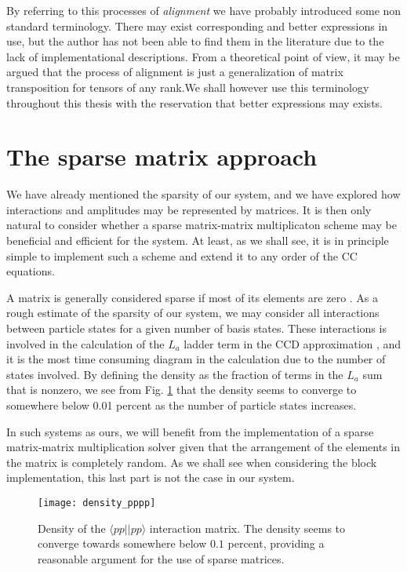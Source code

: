 By referring to this processes of \emph{alignment} we have probably introduced some non standard terminology. There may exist corresponding and better expressions in use, but the author has not been able to find them in the literature due to the lack of implementational descriptions. From a theoretical point of view, it may be argued that the process of alignment is just a generalization of matrix transposition for tensors of any rank.We shall however use this terminology throughout this thesis with the reservation that better expressions may exists.



\section{The sparse matrix approach}

We have already mentioned the sparsity of our system, and we have explored how interactions and amplitudes may be represented by matrices. It is then only natural to consider whether a sparse matrix-matrix  multiplicaton scheme may be beneficial and efficient for the system. At least, as we shall see, it is in principle simple to implement such a scheme and extend it to any order of the CC equations.

A matrix is generally considered sparse if most of its elements are zero \cite[p.122]{Lay}. As a rough estimate of the sparsity of our system, we may consider all interactions between particle states for a given number of basis states. These interactions is involved in the calculation of the $L_a$ ladder term in the CCD approximation  \cite{ShavittBartlett2009}, and it is the most time consuming diagram in the calculation due to the number of states involved. By defining the density as the fraction of terms in the $L_a$ sum that is nonzero, we see from Fig. \ref{fig:density_vpppp} that the density seems to converge to somewhere below 0.01 percent as the number of particle states increases.

In such systems as ours, we will benefit from the implementation of a sparse matrix-matrix multiplication solver given that the arrangement of the elements in the matrix is completely random. As we shall see when considering the block implementation, this last part is not the case in our system. 

\begin{figure}[p]
   \centering
   \texttt{[image: density\_pppp]}
   \caption{Density of the $\langle pp \vert \vert pp \rangle$ interaction matrix. The density seems to converge towards somewhere below $0.1$ percent, providing a reasonable argument for the use of sparse matrices.}
   \label{fig:density_vpppp}
\end{figure}

